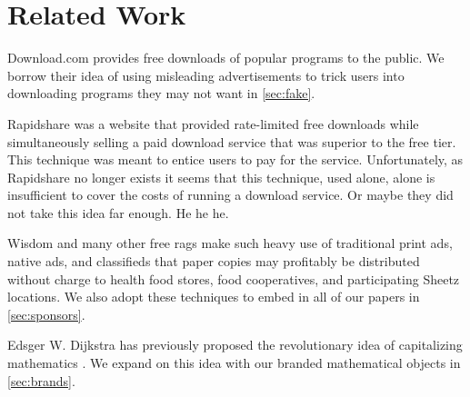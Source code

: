 \section{Related Work}
\label{sec:related}

Download.com \cite{download-com} provides free downloads of popular programs to
the public.
We borrow their idea of using misleading advertisements to trick users into
downloading programs they may not want in \autoref{sec:fake}.

Rapidshare \cite{rapidshare} was a website that provided rate-limited free
downloads while simultaneously selling a paid download service that was
superior to the free tier.
This technique was meant to entice users to pay for the service.
Unfortunately, as Rapidshare no longer exists it seems that this technique, used alone,
alone is insufficient to cover the costs of running a download service. Or maybe they did not take this idea far enough. He he he.

Wisdom \cite{wisdom} and many other free rags make such heavy use of traditional print ads,
native ads, and classifieds that paper copies may profitably be distributed without charge to health food stores, food cooperatives, and participating Sheetz locations.
We also adopt these techniques to embed in all of our papers in
\autoref{sec:sponsors}.

Edsger W. Dijkstra has previously proposed the revolutionary idea of
capitalizing mathematics \cite{cap-math}.
We expand on this idea with our branded mathematical objects in
\autoref{sec:brands}.
